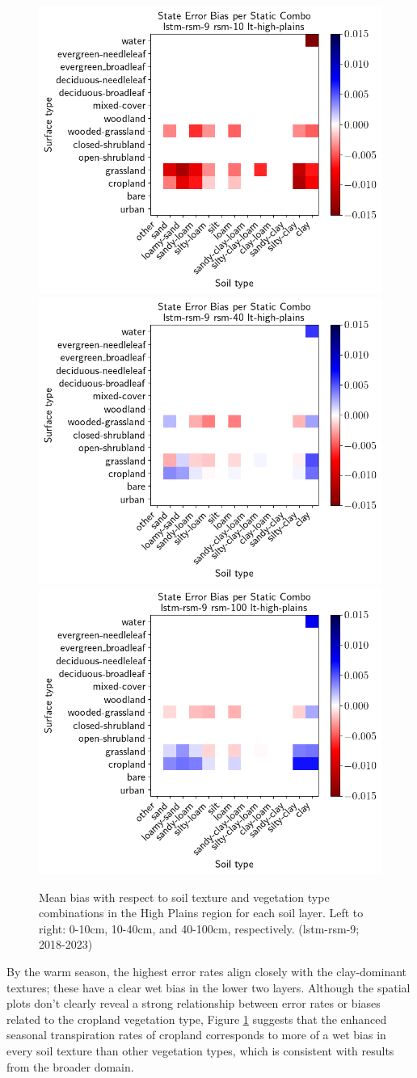 \begin{figure}[H]
    \centering

    \includegraphics[width=.32\linewidth,draft=false]{figures/lt-high-plains/eval-grid_lt-high-plains_lstm-rsm-9_rsm-10_static-combos_bias_state.png}
    \includegraphics[width=.32\linewidth,draft=false]{figures/lt-high-plains/eval-grid_lt-high-plains_lstm-rsm-9_rsm-40_static-combos_bias_state.png}
    \includegraphics[width=.32\linewidth,draft=false]{figures/lt-high-plains/eval-grid_lt-high-plains_lstm-rsm-9_rsm-100_static-combos_bias_state.png}

    \caption{Mean bias with respect to soil texture and vegetation type combinations in the High Plains region for each soil layer. Left to right: 0-10cm, 10-40cm, and 40-100cm, respectively. (lstm-rsm-9; 2018-2023)}
    \label{lt_txtr-biases_high-plains}
\end{figure}

By the warm season, the highest error rates align closely with the clay-dominant textures; these have a clear wet bias in the lower two layers. Although the spatial plots don't clearly reveal a strong relationship between error rates or biases related to the cropland vegetation type, Figure \ref{lt_txtr-biases_high-plains} suggests that the enhanced seasonal transpiration rates of cropland corresponds to more of a wet bias in every soil texture than other vegetation types, which is consistent with results from the broader domain.


